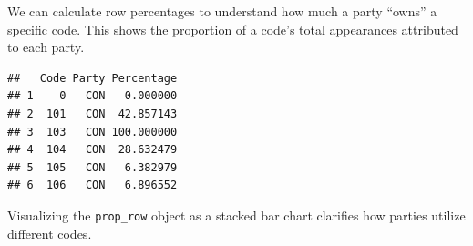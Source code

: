 \documentclass[
]{book}
\newenvironment{Shaded}{\begin{snugshade}}{\end{snugshade}}
\newcommand{\AttributeTok}[1]{\textcolor[rgb]{0.13,0.29,0.53}{#1}}
\newcommand{\CommentTok}[1]{\textcolor[rgb]{0.56,0.35,0.01}{\textit{#1}}}
\newcommand{\DecValTok}[1]{\textcolor[rgb]{0.00,0.00,0.81}{#1}}
\newcommand{\FunctionTok}[1]{\textcolor[rgb]{0.13,0.29,0.53}{\textbf{#1}}}
\newcommand{\NormalTok}[1]{#1}
\newcommand{\OtherTok}[1]{\textcolor[rgb]{0.56,0.35,0.01}{#1}}
\newcommand{\SpecialCharTok}[1]{\textcolor[rgb]{0.81,0.36,0.00}{\textbf{#1}}}
\newcommand{\StringTok}[1]{\textcolor[rgb]{0.31,0.60,0.02}{#1}}
\begin{document}
We can calculate row percentages to understand how much a party ``owns'' a specific code. This shows the proportion of a code's total appearances attributed to each party.

\begin{Shaded}
\end{Shaded}

\begin{verbatim}
##   Code Party Percentage
## 1    0   CON   0.000000
## 2  101   CON  42.857143
## 3  103   CON 100.000000
## 4  104   CON  28.632479
## 5  105   CON   6.382979
## 6  106   CON   6.896552
\end{verbatim}

Visualizing the \texttt{prop\_row} object as a stacked bar chart clarifies how parties utilize different codes.
\end{document}
